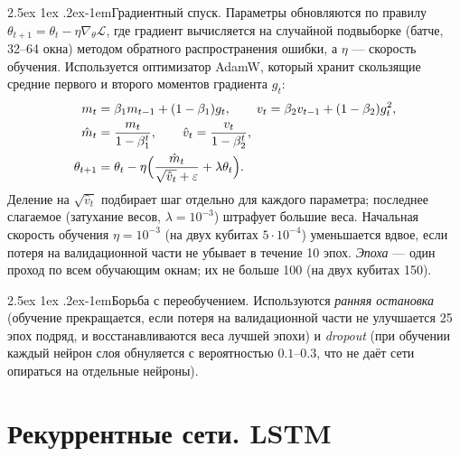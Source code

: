 \documentclass[12pt,a4paper]{report}
\makeatletter
\renewcommand\paragraph{\@startsection{paragraph}{4}{\z@}%
  {2.5ex \@plus1ex \@minus.2ex}{-1em}{\normalfont\normalsize\bfseries}}
\numberwithin{equation}{chapter}
\makeatother
\begin{document}
\paragraph{Градиентный спуск.} Параметры обновляются по правилу
$\theta_{t+1}=\theta_t-\eta\nabla_\theta\mathcal L$, где градиент
вычисляется на случайной подвыборке (батче, 32--64 окна) методом обратного
распространения ошибки, а $\eta$ --- скорость обучения. Используется
оптимизатор AdamW, который хранит скользящие средние первого и второго
моментов градиента $g_t$:
\begin{align}
m_t&=\beta_1m_{t-1}+(1-\beta_1)g_t,\qquad
v_t=\beta_2v_{t-1}+(1-\beta_2)g_t^2,\\
\hat m_t&=\frac{m_t}{1-\beta_1^t},\qquad \hat v_t=\frac{v_t}{1-\beta_2^t},\\
\theta_{t+1}&=\theta_t-\eta\Bigl(\frac{\hat m_t}{\sqrt{\hat v_t}+\varepsilon}
+\lambda\theta_t\Bigr).
\end{align}
Деление на $\sqrt{\hat v_t}$ подбирает шаг отдельно для каждого параметра;
последнее слагаемое (затухание весов, $\lambda=10^{-3}$) штрафует большие
веса. Начальная скорость обучения $\eta=10^{-3}$ (на двух кубитах
$5\cdot10^{-4}$) уменьшается вдвое, если потеря на валидационной части не
убывает в течение 10 эпох. \emph{Эпоха} --- один проход по всем обучающим
окнам; их не больше 100 (на двух кубитах 150).

\paragraph{Борьба с переобучением.} Используются \emph{ранняя остановка}
(обучение прекращается, если потеря на валидационной части не улучшается 25
эпох подряд, и восстанавливаются веса лучшей эпохи) и \emph{dropout}
(при обучении каждый нейрон слоя обнуляется с вероятностью $0.1$--$0.3$,
что не даёт сети опираться на отдельные нейроны).

\section{Рекуррентные сети. LSTM}
\end{document}
